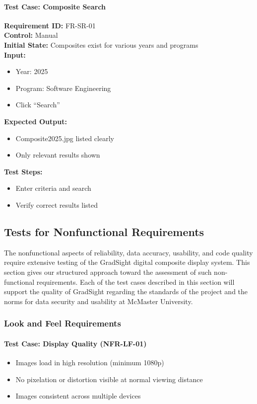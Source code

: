 \documentclass[12pt, titlepage]{article}
\begin{document}
\paragraph{Test Case: Composite Search}
\textbf{Requirement ID:} FR-SR-01 \\
\textbf{Control:} Manual \\
\textbf{Initial State:} Composites exist for various years and programs \\
\textbf{Input:}
\begin{itemize}
    \item Year: 2025
    \item Program: Software Engineering
    \item Click ``Search''
\end{itemize}
\textbf{Expected Output:}
\begin{itemize}
    \item Composite2025.jpg listed clearly
    \item Only relevant results shown
\end{itemize}
\textbf{Test Steps:}
\begin{itemize}
    \item Enter criteria and search
    \item Verify correct results listed
\end{itemize}




\subsection{Tests for Nonfunctional Requirements}

The nonfunctional aspects of reliability, data accuracy, usability, and code quality require extensive testing of the GradSight digital composite display system. This section gives our structured approach toward the assessment of such non-functional requirements. Each of the test cases described in this section will support the quality of GradSight regarding the standards of the project and the norms for data security and usability at McMaster University.

\subsubsection{Look and Feel Requirements}

\paragraph{Test Case: Display Quality (NFR-LF-01)}
\begin{itemize}
    \item Images load in high resolution (minimum 1080p)
    \item No pixelation or distortion visible at normal viewing distance
    \item Images consistent across multiple devices
\end{itemize}
\end{document}
